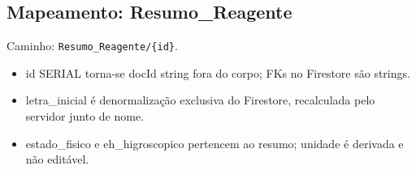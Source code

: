 \subsection*{Mapeamento: Resumo\_Reagente}
Caminho: \texttt{Resumo\_Reagente/\{id\}}.
\begin{itemize}
\item id SERIAL torna-se docId string fora do corpo; FKs no Firestore são strings.
\item letra\_inicial é denormalização exclusiva do Firestore, recalculada pelo servidor junto de nome.
\item estado\_fisico e eh\_higroscopico pertencem ao resumo; unidade é derivada e não editável.
\end{itemize}
